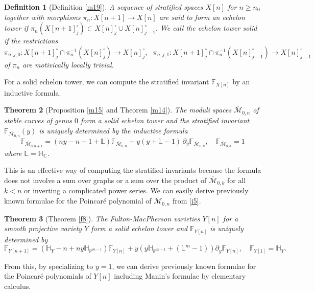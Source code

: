 \documentclass[11pt]{amsart}
\newtheorem{theorem}{Theorem}[section]
\newtheorem{definition}[theorem]{Definition}
\newcommand{\Mbarzn}{\overline{\mathcal M}_{0,n}}
\newcommand{\PP}{\mathbb{P}}
\newcommand{\cM}{\mathcal{M}}
\newcommand{\bcM}{\overline{\cM}}
\def\cM{\mathcal{M}}
\def\CC{\mathbb{C}}
\def\LL{\mathbb{L}}
\def\lra{\longrightarrow}
\def\beq{\begin{equation}}
\def\eeq{\end{equation}}
\def\HH{\mathbb{H}}
\def\FF{\mathbb{F}}
\begin{document}
\begin{definition} [Definition \ref{m19}]
    A sequence of stratified spaces $X[n]$ for $n\ge n_0$ together with morphisms $\pi_n:X[n+1]\to X[n]$ are said to form an \emph{echelon tower} if $\pi_n(X[n+1]_j^\circ)\subset X[n]_j^\circ\cup X[n]_{j-1}^\circ.$ We call the echelon tower \emph{solid} if the restrictions 
    $$\pi_{n,j,0}:X[n+1]_j^\circ\cap \pi_n^{-1}(X[n]_j^\circ)\lra X[n]_j^\circ, \ \ \ 
\pi_{n,j,1}:X[n+1]_j^\circ\cap \pi_n^{-1}(X[n]_{j-1}^\circ)\lra X[n]_{j-1}^\circ $$
    of $\pi_n$ are motivically locally trivial. 
\end{definition}
For a solid echelon tower, we can compute the stratified invariant $\FF_{X[n]}$ by an inductive formula. 

\begin{theorem} [Proposition \ref{m15} and Theorem \ref{m14}] \label{i1}
    The moduli spaces $\Mbarzn$ of stable curves of genus $0$ form a solid echelon tower and the stratified invariant $\FF_{\Mbarzn}(y)$ is uniquely determined by the inductive formula
    \beq\label{i5} \FF_{\bcM_{0,n+1}} = (ny-n+1+\LL)\FF_{\Mbarzn}+y(y+\LL-1)\,\partial_y\FF_{\Mbarzn}, \quad \FF_{\bcM_{0,3}}=1\eeq
where $\LL=\HH_\CC$.
\end{theorem}
This is an effective way of computing the stratified invariants because the formula does not involve a sum over graphs or a sum over the product of $\bcM_{0,k}$ for all $k< n$ or inverting a complicated power series.  
We can easily derive previously known formulae for the Poincar\'e polynomial of $\Mbarzn$ from \eqref{i5}. 

\begin{theorem}[Theorem \ref{f8}] \label{i2}
    The Fulton-MacPherson varieties $Y[n]$ for a smooth projective variety $Y$ form a solid echelon tower and $\FF_{Y[n]}$ is uniquely determined by 
    \[\FF_{Y[n+1]}=\left(\HH_Y-n+ny\HH_{\PP^{m-1}}\right)\FF_{Y[n]}+ y\left(y\HH_{\PP^{m-1}}+ ({\LL^m}-1)\right)\partial_y\FF_{Y[n]},\quad \FF_{Y[1]}=\HH_Y.\]
\end{theorem}
From this, by specializing to $y=1$, we can derive previously known formulae for the Poincar\'e polynomials of $Y[n]$ including Manin's formulae \cite[(4.22) and (4.24)]{Manin1999} by elementary calculus.

\medskip
\end{document}
